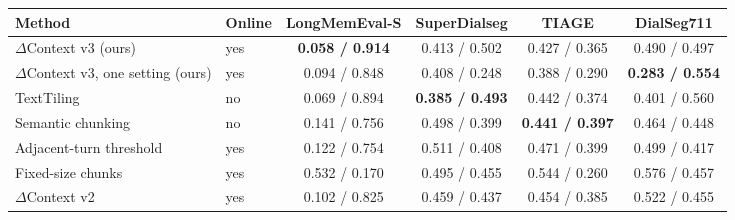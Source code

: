 \begin{tabular}{llcccc}
\toprule
Method & Online & LongMemEval-S & SuperDialseg & TIAGE & DialSeg711 \\
\midrule
$\Delta$Context v3 (ours) & yes & \textbf{0.058 / 0.914} & 0.413 / 0.502 & 0.427 / 0.365 & 0.490 / 0.497 \\
$\Delta$Context v3, one setting (ours) & yes & 0.094 / 0.848 & 0.408 / 0.248 & 0.388 / 0.290 & \textbf{0.283 / 0.554} \\
TextTiling & no & 0.069 / 0.894 & \textbf{0.385 / 0.493} & 0.442 / 0.374 & 0.401 / 0.560 \\
Semantic chunking & no & 0.141 / 0.756 & 0.498 / 0.399 & \textbf{0.441 / 0.397} & 0.464 / 0.448 \\
Adjacent-turn threshold & yes & 0.122 / 0.754 & 0.511 / 0.408 & 0.471 / 0.399 & 0.499 / 0.417 \\
Fixed-size chunks & yes & 0.532 / 0.170 & 0.495 / 0.455 & 0.544 / 0.260 & 0.576 / 0.457 \\
$\Delta$Context v2 & yes & 0.102 / 0.825 & 0.459 / 0.437 & 0.454 / 0.385 & 0.522 / 0.455 \\
\bottomrule
\end{tabular}
